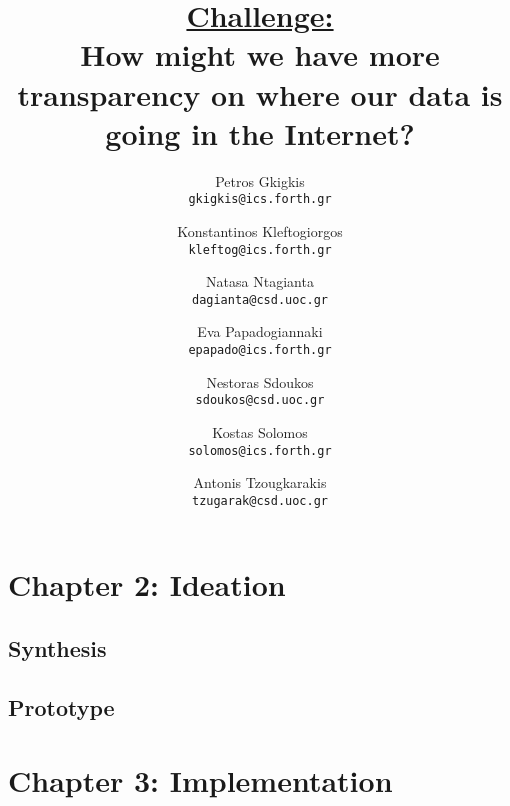\documentclass[11pt, a4paper]{article}
\title{\Large \bf \underline{Challenge:}\\
How might we have more transparency on where our data is going in the Internet?\\}
\author{
	Petros Gkigkis\\
	\texttt{gkigkis@ics.forth.gr}\\
	\and
  	Konstantinos Kleftogiorgos\\
	\texttt{kleftog@ics.forth.gr}\\
	\and
	Natasa Ntagianta\\
	\texttt{dagianta@csd.uoc.gr}\\
  	\and
	Eva Papadogiannaki\\
  	\texttt{epapado@ics.forth.gr}\\
	\and
	Nestoras Sdoukos\\
	\texttt{sdoukos@csd.uoc.gr}\\
	\and
	Kostas Solomos\\
	\texttt{solomos@ics.forth.gr}\\
	\and
	Antonis Tzougkarakis\\
	\texttt{tzugarak@csd.uoc.gr}\\
}
\date{}
\begin{document}
	\maketitle
	\newpage

	\section{Chapter 2: Ideation}
	\subsection{Synthesis}
	
	
	
	\subsection{Prototype}
	
	
	
	
	
	
	
	
	
	
	\section{Chapter 3: Implementation}
	
	
%	
%	
%	
%	
%	
%	
%	
%	
%	
	
\end{document}
